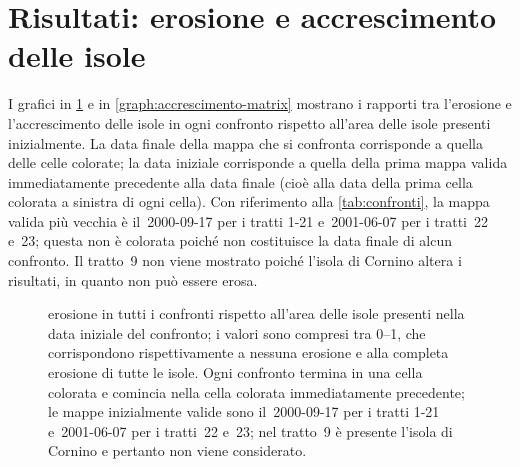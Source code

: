 \section{Risultati: erosione e accrescimento delle isole}
\label{sec:camb-ris}
I grafici in \cref{graph:erosione-matrix} e in \cref{graph:accrescimento-matrix} mostrano i rapporti tra l'erosione e l'accrescimento delle isole in ogni confronto rispetto all'area delle isole presenti inizialmente.
La data finale della mappa che si confronta corrisponde a quella delle celle colorate; la data iniziale corrisponde a quella della prima mappa valida immediatamente precedente alla data finale (cioè alla data della prima cella colorata a sinistra di ogni cella).
Con riferimento alla \cref{tab:confronti}, la mappa valida più vecchia è il~2000-09-17 per i tratti 1-21 e~2001-06-07 per i tratti~22 e~23; questa non è colorata poiché non costituisce la data finale di alcun confronto.
Il tratto~9 non viene mostrato poiché l'isola di Cornino altera i risultati, in quanto non può essere erosa.
%
\begin{figure}
	\centering
	
	\caption[erosione in tutti i confronti rispetto all'area delle isole presenti inizialmente]{erosione in tutti i confronti rispetto all'area delle isole presenti nella data iniziale del confronto; i valori sono compresi tra \numrange[range-phrase = { e }]{0}{1}, che corrispondono rispettivamente a nessuna erosione e alla completa erosione di tutte le isole.
	Ogni confronto termina in una cella colorata e comincia nella cella colorata immediatamente precedente; le mappe inizialmente valide sono il~2000-09-17 per i tratti 1-21 e~2001-06-07 per i tratti~22 e~23; nel tratto~9 è presente l'isola di Cornino e pertanto non viene considerato.}
	\label{graph:erosione-matrix}
\end{figure}
%

